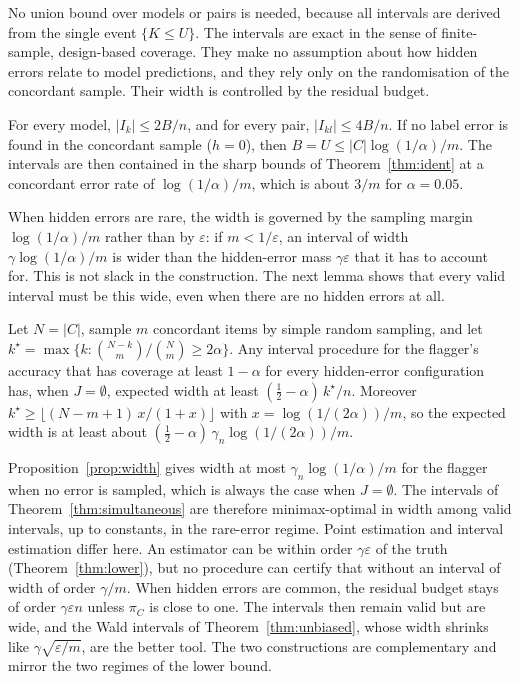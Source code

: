 \documentclass[twoside,11pt]{article}
\newcommand{\1}{\mathbf{1}}
\newcommand{\Cset}{C}
\begin{document}
No union bound over models or pairs is needed, because all intervals are derived from the single event $\{K\le U\}$. The intervals are exact in the sense of finite-sample, design-based coverage. They make no assumption about how hidden errors relate to model predictions, and they rely only on the randomisation of the concordant sample. Their width is controlled by the residual budget.

\begin{proposition}[Width]\label{prop:width}
For every model, $|I_k|\le2B/n$, and for every pair, $|I_{kl}|\le4B/n$. If no label error is found in the concordant sample ($h=0$), then $B=U\le|\Cset|\log(1/\alpha)/m$. The intervals are then contained in the sharp bounds of Theorem~\ref{thm:ident} at a concordant error rate of $\log(1/\alpha)/m$, which is about $3/m$ for $\alpha=0.05$.
\end{proposition}

When hidden errors are rare, the width is governed by the sampling margin $\log(1/\alpha)/m$ rather than by $\varepsilon$: if $m<1/\varepsilon$, an interval of width $\gamma\log(1/\alpha)/m$ is wider than the hidden-error mass $\gamma\varepsilon$ that it has to account for. This is not slack in the construction. The next lemma shows that every valid interval must be this wide, even when there are no hidden errors at all.

\begin{lemma}\label{lem:width}
Let $N=|\Cset|$, sample $m$ concordant items by simple random sampling, and let $k^\star=\max\{k:\binom{N-k}{m}/\binom{N}{m}\ge2\alpha\}$. Any interval procedure for the flagger's accuracy that has coverage at least $1-\alpha$ for every hidden-error configuration has, when $J=\emptyset$, expected width at least $(\tfrac12-\alpha)\,k^\star/n$. Moreover $k^\star\ge\lfloor (N-m+1)\,x/(1+x)\rfloor$ with $x=\log(1/(2\alpha))/m$, so the expected width is at least about $(\tfrac12-\alpha)\,\gamma_n\log(1/(2\alpha))/m$.
\end{lemma}

Proposition~\ref{prop:width} gives width at most $\gamma_n\log(1/\alpha)/m$ for the flagger when no error is sampled, which is always the case when $J=\emptyset$. The intervals of Theorem~\ref{thm:simultaneous} are therefore minimax-optimal in width among valid intervals, up to constants, in the rare-error regime. Point estimation and interval estimation differ here. An estimator can be within order $\gamma\varepsilon$ of the truth (Theorem~\ref{thm:lower}), but no procedure can certify that without an interval of width of order $\gamma/m$. When hidden errors are common, the residual budget stays of order $\gamma\varepsilon n$ unless $\pi_\Cset$ is close to one. The intervals then remain valid but are wide, and the Wald intervals of Theorem~\ref{thm:unbiased}, whose width shrinks like $\gamma\sqrt{\varepsilon/m}$, are the better tool. The two constructions are complementary and mirror the two regimes of the lower bound.
\end{document}
